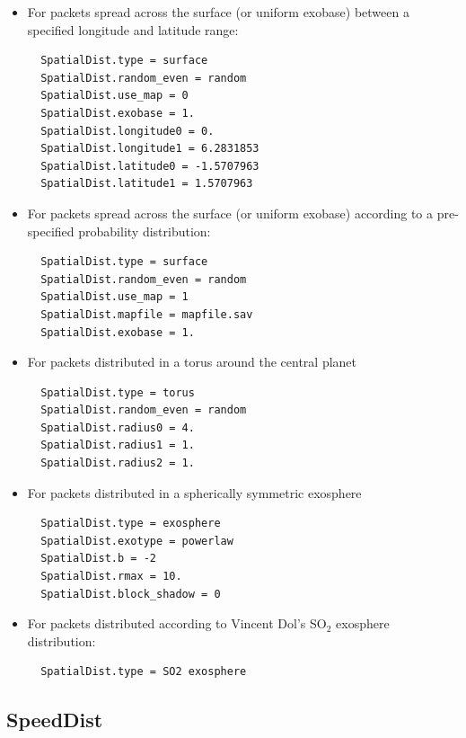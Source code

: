 \documentclass[11pt]{article}
\begin{document}
\begin{itemize}
\item For packets spread across the surface (or uniform exobase) between a 
specified longitude and latitude range:
  \begin{verbatim}
  SpatialDist.type = surface
  SpatialDist.random_even = random
  SpatialDist.use_map = 0
  SpatialDist.exobase = 1.
  SpatialDist.longitude0 = 0.
  SpatialDist.longitude1 = 6.2831853
  SpatialDist.latitude0 = -1.5707963
  SpatialDist.latitude1 = 1.5707963
  \end{verbatim}
\item For packets spread across the surface (or uniform exobase) according to a
pre-specified probability distribution:
  \begin{verbatim}
  SpatialDist.type = surface
  SpatialDist.random_even = random
  SpatialDist.use_map = 1
  SpatialDist.mapfile = mapfile.sav
  SpatialDist.exobase = 1.
  \end{verbatim}
\item For packets distributed in a torus around the central planet
  \begin{verbatim}
  SpatialDist.type = torus
  SpatialDist.random_even = random
  SpatialDist.radius0 = 4.
  SpatialDist.radius1 = 1.
  SpatialDist.radius2 = 1.
  \end{verbatim}
\item For packets distributed in a spherically symmetric exosphere
  \begin{verbatim}
  SpatialDist.type = exosphere
  SpatialDist.exotype = powerlaw
  SpatialDist.b = -2
  SpatialDist.rmax = 10.
  SpatialDist.block_shadow = 0
  \end{verbatim}
\item For packets distributed according to Vincent Dol's SO$_2$ exosphere 
distribution:
  \begin{verbatim}
  SpatialDist.type = SO2 exosphere
  \end{verbatim}
\end{itemize}

\subsection{SpeedDist}
\end{document}
